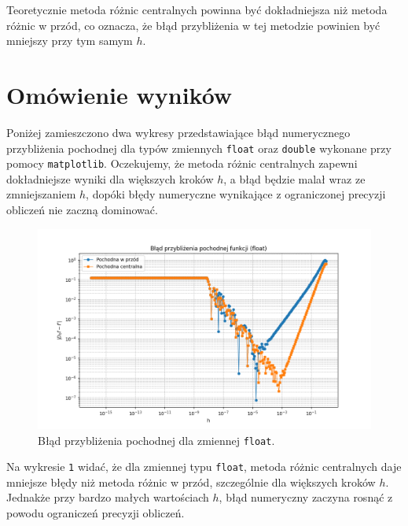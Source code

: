 \documentclass[a4paper, 12pt]{article}
\begin{document}
Teoretycznie metoda różnic centralnych powinna być dokładniejsza niż metoda różnic w przód, co oznacza, że błąd przybliżenia w tej metodzie powinien być mniejszy przy tym samym \( h \).

\section{Omówienie wyników}
Poniżej zamieszczono dwa wykresy przedstawiające błąd numerycznego przybliżenia pochodnej dla typów zmiennych \texttt{float} oraz \texttt{double} wykonane przy pomocy \texttt{matplotlib}. Oczekujemy, że metoda różnic centralnych zapewni dokładniejsze wyniki dla większych kroków \( h \), a błąd będzie malał wraz ze zmniejszaniem \( h \), dopóki błędy numeryczne wynikające z ograniczonej precyzji obliczeń nie zaczną dominować.

\renewcommand{\figurename}{Wykres}

\begin{figure}[H]
    \centering
    \includegraphics[width=1\textwidth]{wykres_blad_float.png}
    \caption{Błąd przybliżenia pochodnej dla zmiennej \texttt{float}.}
    \label{fig:float_error}
\end{figure}

Na wykresie \texttt{1} widać, że dla zmiennej typu \texttt{float}, metoda różnic centralnych daje mniejsze błędy niż metoda różnic w przód, szczególnie dla większych kroków \( h \). Jednakże przy bardzo małych wartościach \( h \), błąd numeryczny zaczyna rosnąć z powodu ograniczeń precyzji obliczeń.
\end{document}
